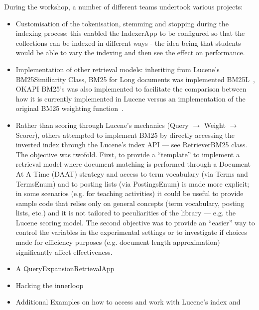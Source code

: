 During the workshop, a number of different teams undertook various projects:
\begin{itemize}
	\item Customisation of the tokenisation, stemming and stopping during the indexing process: this enabled the IndexerApp to be configured so that the collections can be indexed in different ways - the idea being that students would be able to vary the indexing and then see the effect on performance.
	\item Implementation of other retrieval models: inheriting from Lucene's BM25Similiarity Class, BM25 for Long documents was implemented BM25L~\cite{Lv:2011:DVL:2009916.2010070}, OKAPI BM25's was also implemented to facilitate the comparison between how it is currently implemented in Lucene versus an implementation of the original BM25 weighting function~\cite{}.
	\item Rather than scoring through Lucene's mechanics (Query $\rightarrow$ Weight $\rightarrow$ Scorer), others attempted to implement BM25 by directly accessing the inverted index through the Lucene's index API --- see RetrieverBM25 class. The objective was twofold. First, to provide a ``template'' to implement a retrieval model where document matching is performed through a Document At A Time (DAAT) strategy and access to term vocabulary (via Terms and TermsEnum) and to posting lists (via PostingsEnum) is made more explicit; in some scenarios (e.g. for teaching activities) it could be useful to provide sample code that relies only on general concepts (term vocabulary, posting lists, etc.) and it is not tailored to peculiarities of the library --- e.g. the Lucene scoring model. The second objective was to provide an ``easier'' way to control the variables in the experimental settings or to investigate if choices made for efficiency purposes (e.g. document length approximation) significantly affect effectiveness.
	\item A QueryExpansionRetrievalApp
	\item Hacking the innerloop
	\item Additional Examples on how to access and work with Lucene's index and
\end{itemize}
